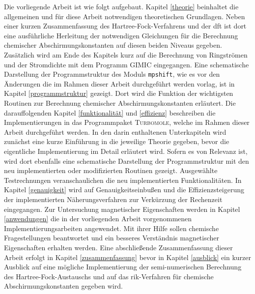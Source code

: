 \bigskip
Die vorliegende Arbeit ist wie folgt aufgebaut. Kapitel \ref{theorie} beinhaltet die allgemeinen und für diese Arbeit notwendigen theoretischen Grundlagen. Neben einer kurzen Zusammenfassung des Hartree-Fock-Verfahrens und der \acl{dft} ist dort eine ausführliche Herleitung der notwendigen Gleichungen für die Berechnung chemischer Abschirmungskonstanten auf diesen beiden Niveaus gegeben. Zusätzlich wird am Ende des Kapitels kurz auf die Berechnung von Ringströmen und der Stromdichte mit dem Programm GIMIC eingegangen. Eine schematische Darstellung der Programmstruktur des Moduls \texttt{mpshift}, wie es vor den Änderungen die im Rahmen dieser Arbeit durchgeführt werden vorlag, ist in Kapitel \ref{programmstruktur} gezeigt. Dort wird die Funktion der wichtigsten Routinen zur Berechnung chemischer Abschirmungskonstanten erläutert. Die darauffolgenden Kapitel \ref{funktionalität} und \ref{effizienz} beschreiben die Implementierungen in das Programmpaket \textsc{Turbomole}, welche im Rahmen dieser Arbeit durchgeführt werden. In den darin enthaltenen Unterkapiteln wird zunächst eine kurze Einführung in die jeweilige Theorie gegeben, bevor die eigentliche Implementierung im Detail erläutert wird. Sofern es von Relevanz ist, wird dort ebenfalls eine schematische Darstellung der Programmstruktur mit den neu implementierten oder modifizierten Routinen gezeigt. Ausgewählte Testrechnungen veranschaulichen die neu implementierten Funktionalitäten. In Kapitel \ref{genauigkeit} wird auf Genauigkeitseinbußen und die Effizienzsteigerung der implementierten Näherungsverfahren zur Verkürzung der Rechenzeit eingegangen. Zur Untersuchung magnetischer Eigenschaften werden in Kapitel \ref{anwendungen} die in der vorliegenden Arbeit vorgenommenen Implementierungsarbeiten angewendet. Mit ihrer Hilfe sollen chemische Fragestellungen beantwortet und ein besseres Verständnis magnetischer Eigenschaften erhalten werden. Eine abschließende Zusammenfassung dieser Arbeit erfolgt in Kapitel \ref{zusammenfassung} bevor in Kapitel \ref{ausblick} ein kurzer Ausblick auf eine mögliche Implementierung der semi-numerischen Berechnung des Hartree-Fock-Austauschs und auf das \ac{rik}-Verfahren für chemische Abschirmungskonstanten gegeben wird.